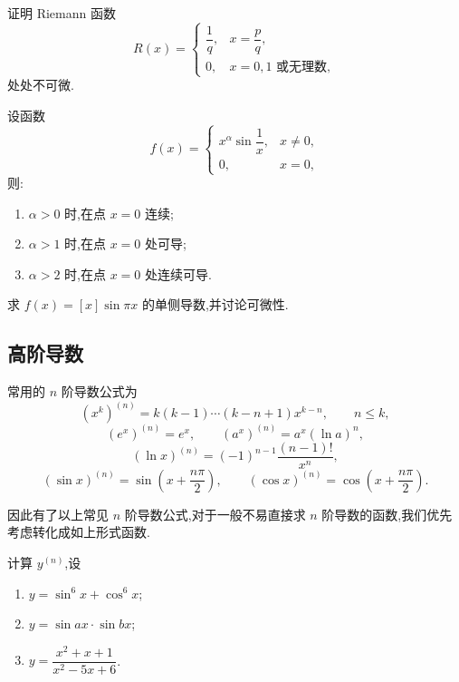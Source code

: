 \documentclass[../../数学分析培优讲义.tex]{subfiles}
\begin{document}
\begin{example}[\markstar]
证明 Riemann 函数
\[
R(x)=
\begin{cases}
    \dfrac{1}{q}, & x=\dfrac{p}{q},\\
    0, & x=0,1\text{ 或无理数},
\end{cases}
\]
处处不可微.
\end{example}
\exampleblank

\begin{proposition}[\markstar]
设函数
\[
f(x)=
\begin{cases}
    x^\alpha\sin\dfrac{1}{x}, & x\neq0,\\
    0, & x=0,
\end{cases}
\]
则:
\begin{enumerate}[label=(\arabic*)]
    \item $\alpha>0$ 时,在点 $x=0$ 连续;
    \item $\alpha>1$ 时,在点 $x=0$ 处可导;
    \item $\alpha>2$ 时,在点 $x=0$ 处连续可导.
\end{enumerate}
\end{proposition}

\begin{example}
求 $f(x)=[x]\sin\pi x$ 的单侧导数,并讨论可微性.
\end{example}
\exampleblank



\subsection{高阶导数}



\begin{theorem}[\markstar]
常用的 $n$ 阶导数公式为
\[
    (x^k)^{(n)}=k(k-1)\cdots(k-n+1)x^{k-n},
    \qquad n\leq k,
\]
\[
    (e^x)^{(n)}=e^x,
    \qquad
    (a^x)^{(n)}=a^x(\ln a)^n,
\]
\[
    (\ln x)^{(n)}=(-1)^{n-1}\dfrac{(n-1)!}{x^n},
\]
\[
    (\sin x)^{(n)}=\sin\left(x+\dfrac{n\pi}{2}\right),
    \qquad
    (\cos x)^{(n)}=\cos\left(x+\dfrac{n\pi}{2}\right).
\]
\end{theorem}

\begin{remark}
因此有了以上常见 $n$ 阶导数公式,对于一般不易直接求 $n$ 阶导数的函数,我们优先考虑转化成如上形式函数.
\end{remark}

\begin{example}
计算 $y^{(n)}$,设
\begin{enumerate}[label=(\arabic*)]
    \item $y=\sin^6x+\cos^6x$;
    \item $y=\sin ax\cdot\sin bx$;
    \item $y=\dfrac{x^2+x+1}{x^2-5x+6}$.
\end{enumerate}
\end{example}
\exampleblank
\end{document}
